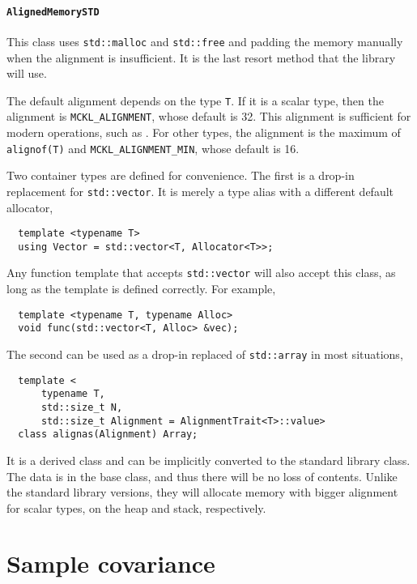 \paragraph{\texttt{AlignedMemorySTD}} This class uses \verb|std::malloc| and
\verb|std::free| and padding the memory manually when the alignment is
insufficient. It is the last resort method that the library will use.

The default alignment depends on the type \verb|T|. If it is a scalar type,
then the alignment is \verb|MCKL_ALIGNMENT|, whose default is 32. This
alignment is sufficient for modern \simd operations, such as \avx. For other
types, the alignment is the maximum of \verb|alignof(T)| and
\verb|MCKL_ALIGNMENT_MIN|, whose default is 16.

Two container types are defined for convenience. The first is a drop-in
replacement for \verb|std::vector|. It is merely a type alias with a different
default allocator,
\begin{Verbatim}
  template <typename T>
  using Vector = std::vector<T, Allocator<T>>;
\end{Verbatim}
Any function template that accepts \verb|std::vector| will also accept this
class, as long as the template is defined correctly. For example,
\begin{Verbatim}
  template <typename T, typename Alloc>
  void func(std::vector<T, Alloc> &vec);
\end{Verbatim}
The second can be used as a drop-in replaced of \verb|std::array| in most
situations,
\begin{Verbatim}
  template <
      typename T,
      std::size_t N,
      std::size_t Alignment = AlignmentTrait<T>::value>
  class alignas(Alignment) Array;
\end{Verbatim}
It is a derived class and can be implicitly converted to the standard
library class. The data is in the base class, and thus there will be no loss of
contents. Unlike the standard library versions, they will allocate memory with
bigger alignment for scalar types, on the heap and stack, respectively.

\section{Sample covariance}
\label{sec:Sample covariance}

